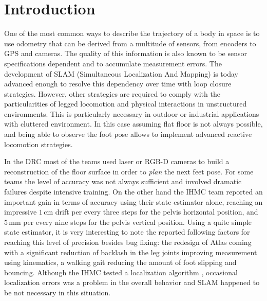 
\section{Introduction}\label{sec:intro}

One of the most common ways to describe the trajectory of a body in space is to use odometry that can be derived from a multitude of sensors, from encoders to GPS and cameras.
The quality of this information is also known to be sensor specifications dependent and to accumulate measurement errors. The development of SLAM (Simultaneous Localization And Mapping) is today advanced enough to resolve 
this dependency over time with loop closure strategies. However, other strategies are required to comply with the particularities of legged locomotion and physical interactions in unstructured environments. 
This is particularly necessary in outdoor or industrial applications with cluttered environment. 
In this case assuming flat floor is not always possible, and being able to observe the foot pose allows to implement advanced
reactive locomotion strategies.

In the DRC \cite{Johnson:jof:2016,Marion:jof:2017,Karumanchi:jof:2017} most of the teams used laser or RGB-D cameras to build a reconstruction of the floor surface in order to \emph{plan}
the next feet pose. For some teams the level of accuracy was not always sufficient and involved dramatic failures \cite{Kaneko:ichr:2015}
despite intensive training.
On the other hand the IHMC team \cite{Johnson:jof:2016} reported an important gain in terms of accuracy using their state estimator alone,
reaching an impressive $1$\,cm drift per every three steps for the pelvis horizontal position,
and $5$\,mm per every nine steps for the pelvis vertical position. Using a quite simple state estimator,
it is very interesting to note the reported following factors for reaching this level of precision besides bug fixing:
the redesign of Atlas coming with a significant reduction of backlash in the leg joints improving measurement
using kinematics, a walking gait reducing the amount of foot slipping and bouncing.
Although the IHMC tested a localization algorithm \cite{Pomerlau:ar:2013}, occasional localization errors was
a problem in the overall behavior and SLAM happened to be not necessary in this situation.

